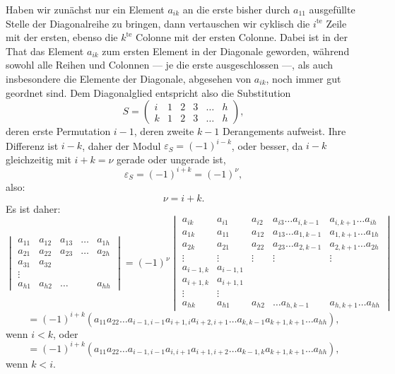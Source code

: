 \documentclass[11pt]{article}
\begin{document}
Haben wir zun\"achst nur ein Element $a_{ik}$ an die erste bisher durch $a_{11}$ ausgef\"ullte Stelle der Diagonalreihe zu bringen, dann vertauschen wir cyklisch die $i^{\text{te}}$ Zeile mit der ersten, ebenso die $k^{\text{te}}$ Colonne mit der ersten Colonne. Dabei ist in der That das Element $a_{ik}$ zum ersten Element in der Diagonale geworden, w\"ahrend sowohl alle Reihen und Colonnen --- je die erste ausgeschlossen ---, als auch insbesondere die Elemente der Diagonale, abgesehen von $a_{ik}$, noch immer gut geordnet sind. Dem Diagonalglied entspricht also die Substitution
\[
S = \begin{pmatrix} i & 1 & 2 & 3 & \ldots & h \\ k & 1 & 2 & 3 & \ldots & h \end{pmatrix},
\]
deren erste Permutation $i - 1$, deren zweite $k - 1$ Derangements aufweist. Ihre Differenz ist $i - k$, daher der Modul $\varepsilon_S = (-1)^{i-k}$, oder besser, da $i - k$ gleichzeitig mit $i + k = \nu$ gerade oder ungerade ist,
\[
\varepsilon_S = (-1)^{i+k} = (-1)^{\nu},
\]
also:
\[
\nu = i + k.
\]
Es ist daher:
\[
\begin{vmatrix}
a_{11} & a_{12} & a_{13} & \ldots & a_{1h} \\
a_{21} & a_{22} & a_{23} & \ldots & a_{2h} \\
a_{31} & a_{32} & & & \\
\vdots & & & & \\
a_{h1} & a_{h2} & \ldots & & a_{hh}
\end{vmatrix}
= (-1)^{\nu}
\begin{vmatrix}
a_{ik} & a_{i1} & a_{i2} & a_{i3} \ldots a_{i,k-1} & a_{i,k+1} \ldots a_{ih} \\
a_{1k} & a_{11} & a_{12} & a_{13} \ldots a_{1,k-1} & a_{1,k+1} \ldots a_{1h} \\
a_{2k} & a_{21} & a_{22} & a_{23} \ldots a_{2,k-1} & a_{2,k+1} \ldots a_{2h} \\
\vdots & \vdots & \vdots & \vdots & \vdots \\
a_{i-1,k} & a_{i-1,1} & & & \\
a_{i+1,k} & a_{i+1,1} & & & \\
\vdots & \vdots & & & \\
a_{hk} & a_{h1} & a_{h2} & \ldots a_{h,k-1} & a_{h,k+1} \ldots a_{hh}
\end{vmatrix}
\]
\[
= (-1)^{i+k} (a_{11} a_{22} \ldots a_{i-1,i-1} a_{i+1,i} a_{i+2,i+1} \ldots a_{k,k-1} a_{k+1,k+1} \ldots a_{hh}),
\]
wenn $i < k$, oder
\[
= (-1)^{i+k} (a_{11} a_{22} \ldots a_{i-1,i-1} a_{i,i+1} a_{i+1,i+2} \ldots a_{k-1,k} a_{k+1,k+1} \ldots a_{hh}),
\]
wenn $k < i$.
\end{document}
